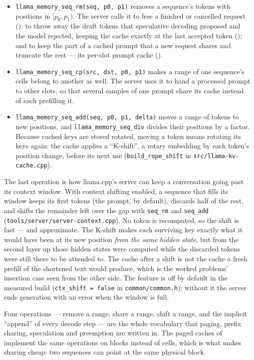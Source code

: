 \begin{itemize}
\item \texttt{llama\_memory\_seq\_rm(seq, p0, p1)} removes a sequence's tokens
with positions in $[p_0, p_1)$. The server calls it to free a finished or
cancelled request (); to throw away the draft tokens
that speculative decoding proposed and the model rejected, keeping the cache
exactly at the last accepted token (); and to keep
the part of a cached prompt that a new request shares and truncate the rest
--- its per-slot prompt cache ().
\item \texttt{llama\_memory\_seq\_cp(src, dst, p0, p1)} makes a range of one
sequence's cells belong to another as well. The server uses it to hand a
processed prompt to other slots, so that several samples of one prompt share
its cache instead of each prefilling it.
\item \texttt{llama\_memory\_seq\_add(seq, p0, p1, delta)} moves a range of
tokens to new positions, and \texttt{llama\_memory\_seq\_div} divides their
positions by a factor. Because cached keys are stored rotated, moving a token
means rotating its keys again: the cache applies a ``K-shift'', a rotary
embedding by each token's position change, before its next use
(\texttt{build\_rope\_shift} in \texttt{src/llama-kv-cache.cpp}).
\end{itemize}

\noindent The last operation is how llama.cpp's server can keep a conversation
going past its context window. With context shifting enabled, a sequence that
fills its window keeps its first tokens (the prompt, by default), discards half
of the rest, and shifts the remainder left over the gap with
\texttt{seq\_rm} and \texttt{seq\_add} (\texttt{tools/server/server-context.cpp}).
No token is recomputed, so the shift is fast --- and approximate. The K-shift
makes each surviving key exactly what it would have been at its new position
\emph{from the same hidden state}, but from the second layer up those hidden
states were computed while the discarded tokens were still there to be attended
to. The cache after a shift is not the cache a fresh prefill of the shortened
text would produce, which is the worked problems' insertion case seen from the
other side. The feature is off by default in the measured build
(\texttt{ctx\_shift = false} in \texttt{common/common.h}); without it the
server ends generation with an error when the window is full.

Four operations --- remove a range, share a range, shift a range, and the
implicit ``append'' of every decode step --- are the whole vocabulary that
paging, prefix sharing, speculation and preemption are written in. The paged
caches of  implement the same operations on blocks instead of
cells, which is what makes sharing cheap: two sequences can point at the same
physical block.

